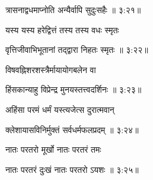 
{\devanagarifont त्रासनाद्वधमाप्नोति अन्यैर्वापि सुदुःसहैः {॥ ३:२१॥} \veg\dontdisplaylinenum }%

{\devanagarifont यस्य यस्य हरेद्वित्तं तस्य तस्य वधः स्मृतः \thinspace{\dandab} \dontdisplaylinenum }%


{\devanagarifont वृत्तिजीवाभिभूतानां तद्द्वारा निहतः स्मृतः {॥ ३:२२॥} \veg\dontdisplaylinenum }%

{\devanagarifont विषवह्निशरशस्त्रैर्मायायोगबलेन वा \thinspace{\dandab} \dontdisplaylinenum }%


{\devanagarifont हिंसकान्याहु विप्रेन्द्र मुनयस्तत्त्वदर्शिनः {॥ ३:२३॥} \veg\dontdisplaylinenum }%



{\devanagarifont अहिंसा परमं धर्मं यस्त्यजेत्स दुरात्मवान् \thinspace{\dandab} \dontdisplaylinenum }%


{\devanagarifont क्लेशायासविनिर्मुक्तं सर्वधर्मफलप्रदम् {॥ ३:२४॥} \veg\dontdisplaylinenum }%
 
{\devanagarifont नातः परतरो मूर्खो नातः परतरं तमः \thinspace{\dandab} \dontdisplaylinenum }%


{\devanagarifont नातः परतरं दुःखं नातः परतरो ऽयशः {॥ ३:२५॥} \veg\dontdisplaylinenum }%
 
